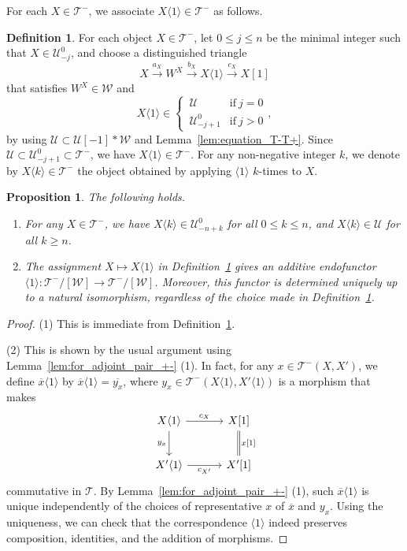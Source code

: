 \documentclass[a4paper,reqno,10pt]{amsart}
\newtheorem{proposition}[proposition]{Proposition}
\theoremstyle{definition}
\newtheorem{definition}[definition]{Definition}
\theoremstyle{definition}
\theoremstyle{definition}
\theoremstyle{definition}
\theoremstyle{plain}
\newcommand{\CT}{\mathcal{T}}
\newcommand{\CU}{\mathcal{U}}
\newcommand{\CW}{\mathcal{W}}
\begin{document}
For each $X\in\CT^-$, we associate $X\langle1\rangle\in\CT^-$ as follows.
\begin{definition}\label{def:functor_<1>}
For each object $X\in\CT^-$, let $0\le j\le n$ be the minimal integer such that $X\in\CU_{-j}^0$, and choose a distinguished triangle
\begin{equation}\label{triangle_<1>}
X\xrightarrow{a_X}W^X\xrightarrow{b_X}X\langle 1\rangle\xrightarrow{c_X}X[1]
\end{equation}
that satisfies $W^X\in\CW$ and 
\[
X\langle 1\rangle\in
\begin{cases}
\, \CU & \text{if}\ j=0\\
\, \CU_{-j+1}^0 & \text{if}\ j>0
\end{cases},
\]
by using $\CU\subset\CU[-1]\ast\CW$ and Lemma~\ref{lem:equation_T-T+}.
Since $\CU\subset\CU_{-j+1}^0\subset\CT^-$, we have $X\langle1\rangle\in\CT^-$.
For any non-negative integer $k$, we denote by $X\langle k\rangle\in\CT^-$ the object obtained by applying $\langle1\rangle$ $k$-times to $X$.
\end{definition}


\begin{proposition}\label{prop:functor_<1>}
The following holds.
\begin{enumerate}
\item For any $X\in\CT^-$, we have $X\langle k\rangle\in\CU_{-n+k}^0$ for all $0\le k\le n$, and  $X\langle k\rangle\in\CU$ for all $k\ge n$.
\item The assignment $X\mapsto X\langle1\rangle$ in Definition~\ref{def:functor_<1>} gives an additive endofunctor 
$\langle1\rangle\colon\CT^-/[\CW]\to \CT^-/[\CW]$. Moreover, this functor is determined uniquely up to a natural isomorphism, regardless of the choice made in Definition~\ref{def:functor_<1>}.
\end{enumerate}

\end{proposition}
\begin{proof}
{\rm (1)} This is immediate from Definition~\ref{def:functor_<1>}.

{\rm (2)} This is shown by the usual argument using Lemma~\ref{lem:for_adjoint_pair_+-} {\rm (1)}.
In fact, for any $x\in\CT^-(X,X')$, we define $\overline{x}\langle1\rangle$ by $\overline{x}\langle1\rangle=\overline{y_x}$, where $y_x\in\CT^-(X\langle1\rangle,X'\langle1\rangle)$ is a morphism that makes
\[
\begin{tikzcd}[row sep=0.8cm, column sep=1.1cm]
X\langle1\rangle \arrow{r}{c_X}\arrow{d}[swap]{y_x}
&X{[}1{]} \arrow[equal]{d}{x[1]}
\\
X'\langle1\rangle \arrow{r}[swap]{c_{X'}}
&X'{[}1{]}
\end{tikzcd}
\]
commutative in $\CT$. By Lemma~\ref{lem:for_adjoint_pair_+-} {\rm (1)}, such $\overline{x}\langle1\rangle$ is unique independently of the choices of representative $x$ of $\overline{x}$ and $y_x$. 
Using the uniqueness, we can check that the correspondence $\langle1\rangle$ indeed preserves composition, identities, and the addition of morphisms.
\normalcolor
\end{proof}
\end{document}
